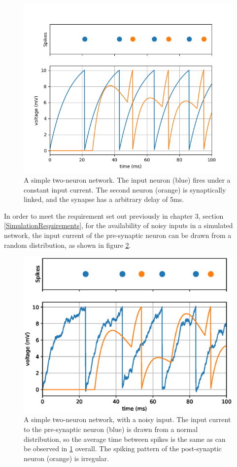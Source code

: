 \begin{figure}[h!]
    \centering
    \includegraphics[width=0.7\linewidth]{figures/graphs/DelayBugFixed.png}
    \caption[A simple two-neuron network]{A simple two-neuron network. The input neuron (blue) fires under a constant input current. The second neuron (orange) is synaptically linked, and the synapse has a arbitrary delay of 5ms.}
    \label{fig:PRERES1}
\end{figure}
\FloatBarrier
In order to meet the requirement set out previously in chapter 3, section
\ref{SimulationRequirements}, for the availability of noisy inputs in a
simulated network, the input current of the pre-synaptic neuron can be drawn
from a random distribution, as shown in figure \ref{fig:PRERES2}. 

\begin{figure}[h!]
    \centering
    \includegraphics[width=0.7\linewidth]{figures/graphs/twospikingneuronsdelaynoise.eps}
    \caption[A simple two-neuron network with noise]{A simple two-neuron network, with a noisy input. The input current to the pre-synaptic neuron (blue) is drawn from a normal distribution, so the average time between spikes is the same as can be observed in \ref{fig:PRERES1} overall. The spiking pattern of the post-synaptic neuron (orange) is irregular.}
    \label{fig:PRERES2}
\end{figure}
\FloatBarrier

